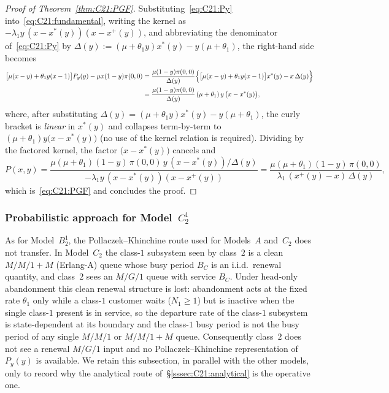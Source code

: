\begin{proof}[Proof of Theorem~\ref{thm:C21:PGF}]
Substituting~\eqref{eq:C21:Py} into~\eqref{eq:C21:fundamental}, writing the kernel as
$-\lambda_1 y\,(x-x^*(y))(x-x^+(y))$, and abbreviating the denominator
of~\eqref{eq:C21:Py} by $\Delta(y):=(\mu+\theta_1 y)x^*(y)-y(\mu+\theta_1)$, the right-hand
side becomes
\begin{align*}
    \bigl[\mu(x-y)+\theta_1 y(x-1)\bigr]P_y(y)-\mu x(1-y)\pi(0,0)
    &= \frac{\mu(1-y)\pi(0,0)}{\Delta(y)}
       \Bigl\{\bigl[\mu(x-y)+\theta_1 y(x-1)\bigr]x^*(y) - x\,\Delta(y)\Bigr\} \\
    &= \frac{\mu(1-y)\pi(0,0)}{\Delta(y)}\,(\mu+\theta_1)\,y\,\bigl(x-x^*(y)\bigr),
\end{align*}
where, after substituting $\Delta(y)=(\mu+\theta_1 y)x^*(y)-y(\mu+\theta_1)$, the curly
bracket is \emph{linear} in $x^*(y)$ and collapses term-by-term to
$(\mu+\theta_1)y\bigl(x-x^*(y)\bigr)$ (no use of the kernel relation is required). Dividing by
the factored kernel, the factor
$\bigl(x-x^*(y)\bigr)$ cancels and
\begin{equation*}
    P(x,y) = \frac{\mu(\mu+\theta_1)(1-y)\,\pi(0,0)\,y\,(x-x^*(y))/\Delta(y)}
                  {-\lambda_1 y\,(x-x^*(y))(x-x^+(y))}
           = \frac{\mu(\mu+\theta_1)(1-y)\,\pi(0,0)}
                  {\lambda_1\,(x^+(y)-x)\,\Delta(y)},
\end{equation*}
which is~\eqref{eq:C21:PGF} and concludes the proof.
\end{proof}

\subsubsection{Probabilistic approach for Model~\texorpdfstring{$C_2^1$}{C21}}\label{sssec:C21:probabilistic}

As for Model~$B_2^1$, the Pollaczek--Khinchine route used for Models~$A$ and~$C_2$ does not
transfer. In Model~$C_2$ the class-$1$ subsystem seen by class~$2$ is a clean $M/M/1{+}M$
(Erlang-A) queue whose busy period $B_C$ is an i.i.d.\ renewal quantity, and class~$2$ sees
an $M/G/1$ queue with service $B_C$. Under head-only abandonment this clean renewal
structure is lost: abandonment acts at the fixed rate $\theta_1$ only while a class-$1$
customer waits ($N_1\ge1$) but is inactive when the single class-$1$ present is in service,
so the departure rate of the class-$1$ subsystem is state-dependent at its boundary and the
class-$1$ busy period is not the busy period of any single $M/M/1$ or $M/M/1{+}M$ queue.
Consequently class~$2$ does not see a renewal $M/G/1$ input and no Pollaczek--Khinchine
representation of $P_y(y)$ is available. We retain this subsection, in parallel with the
other models, only to record why the analytical route of~\S\ref{sssec:C21:analytical} is the
operative one.

